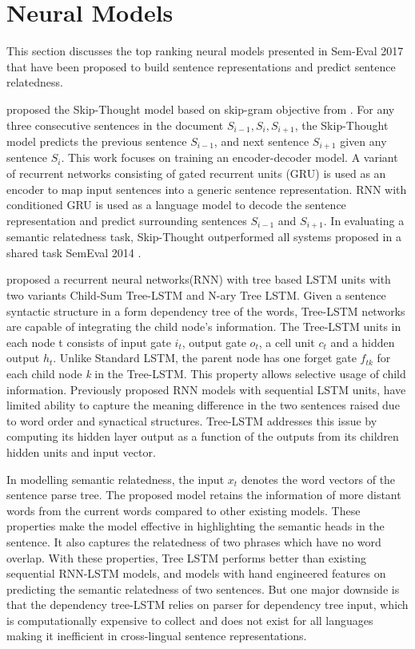 \documentclass[12pt]{report} %
\begin{document}
\section{Neural Models} 

This section discusses the top ranking neural models presented in Sem-Eval 2017 that have been proposed to build sentence representations and predict sentence relatedness.

\cite{kiros2015skip} proposed the Skip-Thought model based on skip-gram objective from \cite{mikolov2014word2vec}. For any three consecutive sentences in the document $S_{i-1}, S_{i}, S_{i+1}$, the Skip-Thought model predicts the previous sentence $S_{i-1}$, and next sentence $S_{i+1}$ given any sentence $S_{i}$.
This work focuses on training an encoder-decoder model. A variant of recurrent networks consisting of gated recurrent units (GRU) \citep{cho2014learning} is used as an encoder to map input sentences into a generic sentence representation. RNN with conditioned GRU is used as a language model to decode the sentence representation and predict surrounding sentences $S_{i-1}$ and $S_{i+1}$. In evaluating a semantic relatedness task, Skip-Thought outperformed all systems proposed in a shared task SemEval 2014 \citep{marelli2014semeval}.

\cite{tai2015improved} proposed a recurrent neural networks(RNN) with tree based LSTM units with two variants Child-Sum Tree-LSTM and N-ary Tree LSTM. Given a sentence syntactic structure in a form dependency tree of the words, Tree-LSTM networks are capable of integrating the child node's information. The Tree-LSTM units in each node t consists of input gate $i_{t}$, output gate $o_{t}$, a cell unit $c_{t}$ and a hidden output $h_{t}$. Unlike Standard LSTM, the parent node has one forget gate $f_{tk}$ for each child node \textit{k} in the Tree-LSTM. This property allows selective usage of child information. Previously proposed RNN models with sequential LSTM units, have limited ability to capture the meaning difference in the two sentences raised due to word order and synactical structures. Tree-LSTM addresses this issue by computing its hidden layer output as a function of the outputs from its children hidden units and input vector. 

In modelling semantic relatedness, the input $x_{t}$ denotes the word vectors of the sentence parse tree. The proposed model retains the information of more distant words from the current words compared to other existing models. These properties make the model effective in highlighting the semantic heads in the sentence. It also captures the relatedness of two phrases which have no word overlap. With these properties, Tree LSTM performs better than existing sequential RNN-LSTM models, and models with hand engineered features on predicting the semantic relatedness of two sentences. But one major downside is that the dependency tree-LSTM relies on parser for dependency tree input, which is computationally expensive to collect and does not exist for all languages making it inefficient in cross-lingual sentence representations.
\end{document}
